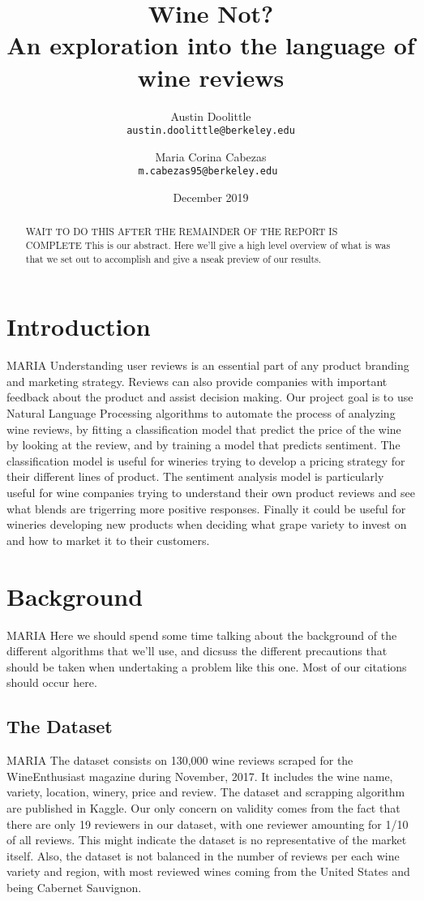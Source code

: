 \documentclass[11pt,english]{article}
\title{
    Wine Not? \\
    \large An exploration into the language of wine reviews
}
\author{
    Austin Doolittle \\
    \texttt{austin.doolittle@berkeley.edu}
    \and
    Maria Corina Cabezas \\
    \texttt{m.cabezas95@berkeley.edu }
}
\date{December 2019}
\begin{document}
\maketitle
\begin{abstract}
    WAIT TO DO THIS AFTER THE REMAINDER OF THE REPORT IS COMPLETE
    This is our abstract. Here we'll give a high level overview of what is was that we set out to accomplish and give a nseak preview of our results.
\end{abstract}

\section{Introduction}
    MARIA
    Understanding user reviews is an essential part of any product branding and marketing strategy. Reviews can also provide companies with important feedback about the product and assist decision making. Our project goal is to use Natural Language Processing algorithms to automate the process of analyzing wine reviews, by fitting a classification model that predict the price of the wine by looking at the review, and by training a model that predicts sentiment.
    The classification model is useful for wineries trying to develop a pricing strategy for their different lines of product. The sentiment analysis model is particularly useful for wine companies trying to understand their own product reviews and see what blends are trigerring more positive responses. Finally it could be useful for wineries developing new products when deciding what grape variety to invest on and how to market it to their customers. 
\section{Background}
    MARIA
    Here we should spend some time talking about the background of the different algorithms that we'll use, and dicsuss the different precautions that should be taken when undertaking a problem like this one. Most of our citations should occur here.

\subsection{The Dataset}
    MARIA
    The dataset consists on 130,000 wine reviews scraped for the WineEnthusiast magazine during November, 2017. It includes the wine name, variety, location, winery, price and review. The dataset and scrapping algorithm are published in Kaggle. 
    Our only concern on validity comes from the fact that there are only 19 reviewers in our dataset, with one reviewer amounting for 1/10 of all reviews. This might indicate the dataset is no representative of the market itself. 
    Also, the dataset is not balanced in the number of reviews per each wine variety and region, with most reviewed wines coming from the United States and being Cabernet Sauvignon. 
\end{document}
